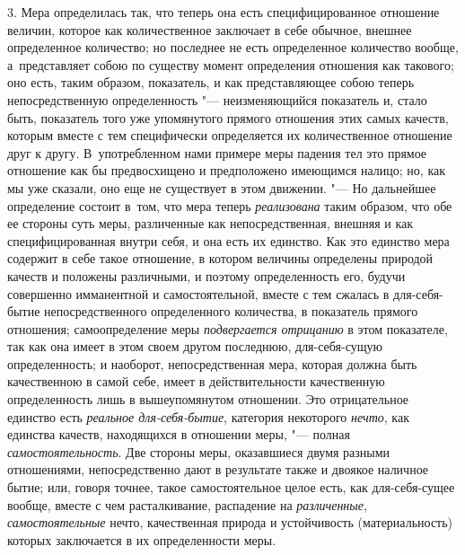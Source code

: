 3. Мера определилась так, что теперь она есть специфицированное отношение
величин, которое как количественное заключает в себе обычное, внешнее
определенное количество; но последнее не есть определенное количество вообще,
а~представляет собою по существу момент определения отношения как такового;
оно есть, таким образом, показатель, и как представляющее собою теперь
непосредственную определенность "--- неизменяющийся показатель и, стало быть,
показатель того уже упомянутого прямого отношения этих самых качеств, которым
вместе с тем специфически определяется их количественное отношение друг к
другу. В~употребленном нами примере меры падения тел это прямое отношение как
бы предвосхищено и предположено имеющимся налицо; но, как мы уже сказали, оно
еще не существует в этом движении. "--- Но дальнейшее определение состоит
в~том, что мера теперь {\em реализована} таким образом, что обе ее стороны суть
меры, различенные как непосредственная, внешняя и как специфицированная внутри
себя, и она есть их единство. Как это единство мера содержит в себе такое
отношение, в котором величины определены природой качеств и положены
различными, и поэтому определенность его, будучи совершенно имманентной и
самостоятельной, вместе с тем сжалась в для-себя-бытие непосредственного
определенного количества, в показатель прямого отношения; самоопределение меры
{\em подвергается отрицанию} в этом показателе, так как она имеет в этом своем
другом последнюю, для-себя-сущую определенность; и наоборот, непосредственная
мера, которая должна быть качественною в самой себе, имеет в действительности
качественную определенность лишь в вышеупомянутом отношении. Это отрицательное
единство есть {\em реальное для-себя-бытие}, категория некоторого {\em нечто},
как единства качеств, находящихся в отношении меры, "--- полная
{\em самостоятельность}. Две стороны меры, оказавшиеся двумя разными
отношениями, непосредственно дают в результате также и двоякое наличное бытие;
или, говоря точнее, такое самостоятельное целое есть, как для-себя-сущее
вообще, вместе с чем расталкивание, распадение на {\em различенные},
{\em самостоятельные} нечто, качественная природа и устойчивость
(материальность) которых заключается в их определенности меры.
